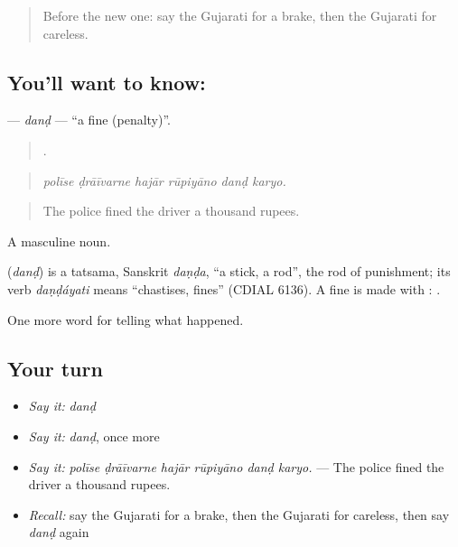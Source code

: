 \label{lesson:GU-C295-dand}



\begin{quote}
Before the new one: say the Gujarati for a brake, then the Gujarati for careless.
\end{quote}

\subsection*{You'll want to know: }
\textbf{} — \emph{danḍ} — \textquotedblleft{}a fine (penalty)\textquotedblright{}.

\begin{quote}
     .
\end{quote}

\begin{quote}
\emph{polīse ḍrāīvarne hajār rūpiyāno danḍ karyo.}
\end{quote}

\begin{quote}
The police fined the driver a thousand rupees.
\end{quote}

A masculine noun.

\begin{cousinweb}
\textbf{} (\emph{danḍ}) is a tatsama, Sanskrit \emph{daṇḍa}, \textquotedblleft{}a stick, a rod\textquotedblright{}, the rod of punishment; its verb \emph{daṇḍáyati} means \textquotedblleft{}chastises, fines\textquotedblright{} (CDIAL 6136). A fine is made with \textbf{}: \textbf{ }.
\end{cousinweb}

\begin{grammarlens}[title={What you've built}]
One more word for telling what happened.
\end{grammarlens}

\subsection*{Your turn}
\begin{itemize}
\raggedright
  \item \emph{Say it:} \emph{danḍ}
  \item \emph{Say it:} \emph{danḍ}, once more
  \item \emph{Say it:} \emph{polīse ḍrāīvarne hajār rūpiyāno danḍ karyo.} — The police fined the driver a thousand rupees.
  \item \emph{Recall:} say the Gujarati for a brake, then the Gujarati for careless, then say \emph{danḍ} again
\end{itemize}

